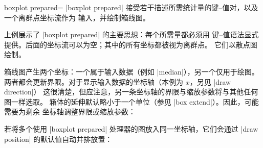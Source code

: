 \begin{plottype}[/pgfplots]{boxplot prepared=%
    \textcolor{black}{\normalfont{}}%
}
    |boxplot prepared| 接受若干描述所需统计量的键--值对，以及一个离群点坐标流作为
    输入，并绘制箱线图。
\begin{codeexample}[]
\end{codeexample}
    \noindent 上例展示了 |boxplot prepared| 的主要思想：每个所需量都必须用
    键--值语法显式提供。后面的坐标流可以为空；其中的所有坐标都被视为离群点。
    它们以散点图绘制。

    箱线图产生两个坐标：一个属于输入数据（例如 |median|），另一个仅用于绘图。
    两者都会更新界限。对于显示输入数据的坐标轴（本例为 $x$，另见 |draw direction|）
    这很清楚，但应注意，另一条坐标轴的界限与缩放参数将与其他任何图一样选取。
    箱体的延伸默认略小于一个单位（参见 |box extend|）。因此，可能需要为剩余
    坐标轴调整界限或缩放参数：
\begin{codeexample}[]
\end{codeexample}
\end{plottype}

若将多个使用 |boxplot prepared| 处理器的图放入同一坐标轴，它们会通过
|draw position| 的默认值自动并排放置：

